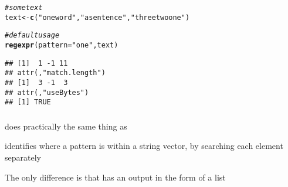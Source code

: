 \documentclass[12pt]{beamer}\usepackage[]{graphicx}\usepackage[]{color}
\makeatletter
\newcommand{\hlstr}[1]{\textcolor[rgb]{0.192,0.494,0.8}{#1}}%
\newcommand{\hlcom}[1]{\textcolor[rgb]{0.678,0.584,0.686}{\textit{#1}}}%
\newcommand{\hlstd}[1]{\textcolor[rgb]{0.345,0.345,0.345}{#1}}%
\newcommand{\hlkwb}[1]{\textcolor[rgb]{0.69,0.353,0.396}{#1}}%
\newcommand{\hlkwc}[1]{\textcolor[rgb]{0.333,0.667,0.333}{#1}}%
\newcommand{\hlkwd}[1]{\textcolor[rgb]{0.737,0.353,0.396}{\textbf{#1}}}%
\newenvironment{kframe}{%
 \def\at@end@of@kframe{}%
 \ifinner\ifhmode%
  \def\at@end@of@kframe{\end{minipage}}%
  \begin{minipage}{\columnwidth}%
 \fi\fi%
 \def\FrameCommand##1{\hskip\@totalleftmargin \hskip-\fboxsep
 \colorbox{shadecolor}{##1}\hskip-\fboxsep
     \hskip-\linewidth \hskip-\@totalleftmargin \hskip\columnwidth}%
 \MakeFramed {\advance\hsize-\width
   \@totalleftmargin\z@ \linewidth\hsize
   \@setminipage}}%
 {\par\unskip\endMakeFramed%
 \at@end@of@kframe}
\newenvironment{knitrout}{}{} %
\makeatother
\begin{document}

\begin{frame}[fragile]
\frametitle{}

\begin{knitrout}\footnotesize
{}\color{fgcolor}\begin{kframe}
\begin{alltt}
\hlcom{# some text}
\hlstd{text} \hlkwb{<-} \hlkwd{c}\hlstd{(}\hlstr{"one word"}\hlstd{,} \hlstr{"a sentence"}\hlstd{,} \hlstr{"three two one"}\hlstd{)}

\hlcom{# default usage}
\hlkwd{regexpr}\hlstd{(}\hlkwc{pattern} \hlstd{=} \hlstr{"one"}\hlstd{, text)}
\end{alltt}
\begin{verbatim}
## [1]  1 -1 11
## attr(,"match.length")
## [1]  3 -1  3
## attr(,"useBytes")
## [1] TRUE
\end{verbatim}
\end{kframe}
\end{knitrout}

\end{frame}


\begin{frame}[fragile]
\frametitle{}

\bi
  \item {} does practically the same thing as 
  \item identifies where a pattern is within a string vector, by searching each element separately
  \item The only difference is that  has an output in the form of a list
\ei

\end{frame}

\end{document}
